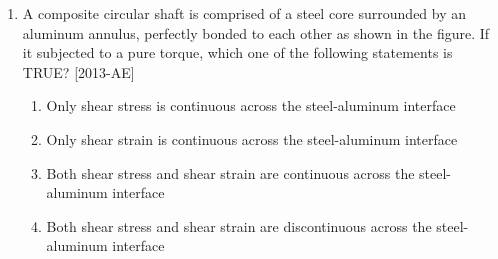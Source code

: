 \documentclass[journal]{IEEEtran}
\begin{document}
\begin{enumerate}[start=27]
\begin{figure}[H]
			\centering
			
			\label{38}
		\end{figure}
\begin{enumerate}
\end{enumerate}
\item A composite circular shaft is comprised of a steel core surrounded by an aluminum annulus, perfectly bonded to each other as shown in the figure. If it subjected to a pure torque, which one of the following statements is TRUE? \hfill{[2013-AE]}\\
\begin{figure}[H]
			\centering
			
			\label{39}
		\end{figure}
\begin{enumerate}
    \item Only shear stress is continuous across the steel-aluminum interface
    \item Only shear strain is continuous across the steel-aluminum interface
    \item Both shear stress and shear strain are continuous across the steel-aluminum interface
    \item Both shear stress and shear strain are discontinuous across the steel-aluminum interface
\end{enumerate}
\end{enumerate}
\end{document}
